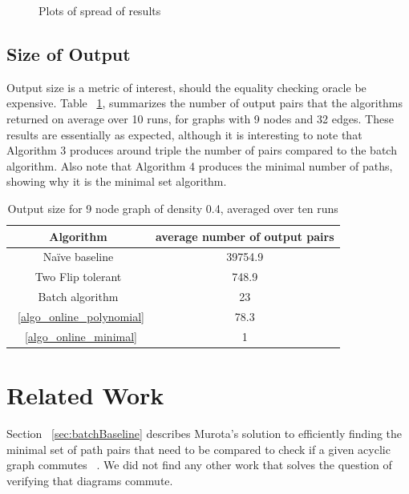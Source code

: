 \documentclass[sigplan,review,nonacm=true]{acmart}
\begin{document}
{\begin{figure}

    \caption{Plots of spread of results}
    \label{fig:variance}
\end{figure}

\subsection{Size of Output}
Output size is a metric of interest, should the equality checking oracle be expensive.
Table ~\ref{tab:sizes}, summarizes the number of output pairs that the algorithms returned on average over 10 runs, for graphs with 9 nodes and 32 edges.
These results are essentially as expected, although it is interesting to note that Algorithm 3 produces around triple the number of pairs compared to the batch algorithm.
Also note that Algorithm 4 produces the minimal number of paths, showing why it is the minimal set algorithm.

\begin{table}
\begin{tabular}{|c|c|}
    \hline
    Algorithm & average number of output pairs \\
    \hline
    Na\"{i}ve baseline & 39754.9 \\
    Two Flip tolerant & 748.9 \\
    Batch algorithm & 23 \\
    ~\ref{algo_online_polynomial} & 78.3 \\
    ~\ref{algo_online_minimal} & 1 \\
    \hline
\end{tabular}
\caption{Output size for 9 node graph of density 0.4, averaged over ten runs}
\label{tab:sizes}
\end{table}

\section{Related Work}

Section ~\ref{sec:batchBaseline} describes Murota's solution to efficiently finding the minimal set of path pairs that need to be compared to check if a given acyclic graph commutes ~\cite{commutative}.
We did not find any other work that solves the question of verifying that diagrams commute.

}
\end{document}
